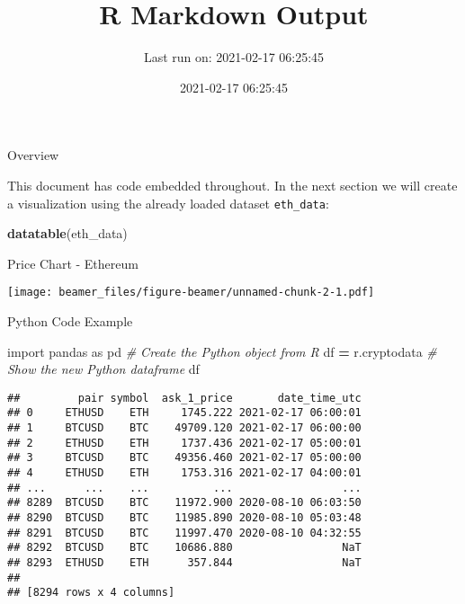 \documentclass[
  ignorenonframetext,
]{beamer}
\title{R Markdown Output}
\subtitle{Last run on: 2021-02-17 06:25:45}
\author{}
\date{\vspace{-2.5em}2021-02-17 06:25:45}
\newenvironment{Shaded}{\begin{snugshade}}{\end{snugshade}}
\newcommand{\CommentTok}[1]{\textcolor[rgb]{0.56,0.35,0.01}{\textit{#1}}}
\newcommand{\ImportTok}[1]{#1}
\newcommand{\KeywordTok}[1]{\textcolor[rgb]{0.13,0.29,0.53}{\textbf{#1}}}
\newcommand{\NormalTok}[1]{#1}
\newcommand{\OperatorTok}[1]{\textcolor[rgb]{0.81,0.36,0.00}{\textbf{#1}}}
\begin{document}
\frame{\titlepage}

\begin{frame}[fragile]{Overview}
\protect\hypertarget{overview}{}

This document has code embedded throughout. In the next section we will
create a visualization using the already loaded dataset
\texttt{eth\_data}:

\begin{Shaded}
\begin{Highlighting}[]
\KeywordTok{datatable}\NormalTok{(eth_data)}
\end{Highlighting}
\end{Shaded}

\hypertarget{htmlwidget-5bea121977bed115ed1a}{}

\end{frame}

\begin{frame}{Price Chart - Ethereum}
\protect\hypertarget{price-chart---ethereum}{}

\texttt{[image: beamer\_files/figure-beamer/unnamed-chunk-2-1.pdf]}

\end{frame}

\begin{frame}[fragile]{Python Code Example}
\protect\hypertarget{python-code-example}{}

\begin{Shaded}
\begin{Highlighting}[]
\ImportTok{import}\NormalTok{ pandas }\ImportTok{as}\NormalTok{ pd}
\CommentTok{# Create the Python object from R}
\NormalTok{df }\OperatorTok{=}\NormalTok{ r.cryptodata}
\CommentTok{# Show the new Python dataframe}
\NormalTok{df}
\end{Highlighting}
\end{Shaded}

\begin{verbatim}
##         pair symbol  ask_1_price       date_time_utc
## 0     ETHUSD    ETH     1745.222 2021-02-17 06:00:01
## 1     BTCUSD    BTC    49709.120 2021-02-17 06:00:00
## 2     ETHUSD    ETH     1737.436 2021-02-17 05:00:01
## 3     BTCUSD    BTC    49356.460 2021-02-17 05:00:00
## 4     ETHUSD    ETH     1753.316 2021-02-17 04:00:01
## ...      ...    ...          ...                 ...
## 8289  BTCUSD    BTC    11972.900 2020-08-10 06:03:50
## 8290  BTCUSD    BTC    11985.890 2020-08-10 05:03:48
## 8291  BTCUSD    BTC    11997.470 2020-08-10 04:32:55
## 8292  BTCUSD    BTC    10686.880                 NaT
## 8293  ETHUSD    ETH      357.844                 NaT
## 
## [8294 rows x 4 columns]
\end{verbatim}

\end{frame}
\end{document}
